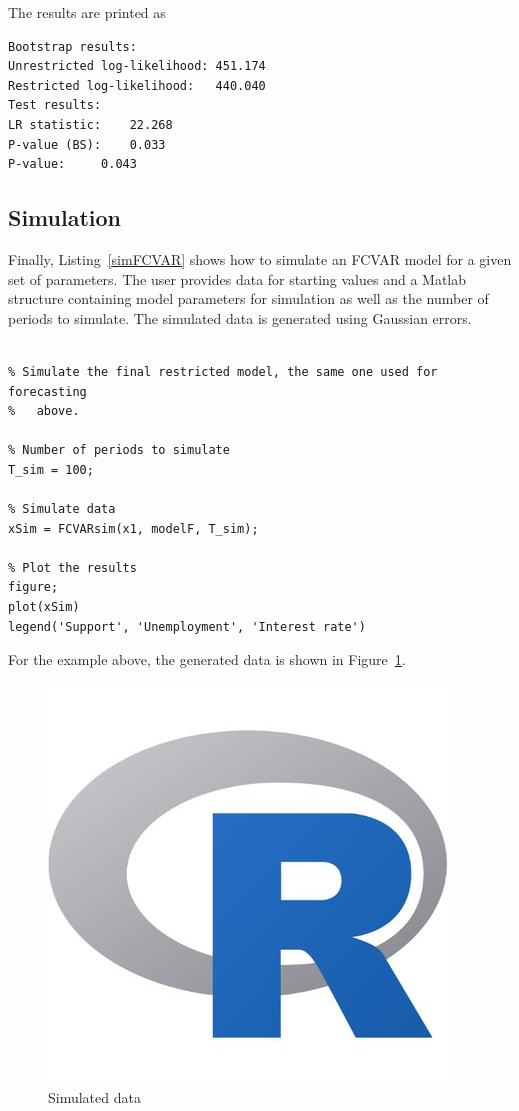 \documentclass[10pt]{article}
\begin{document}
The results are printed as
\begin{verbatim}
Bootstrap results:
Unrestricted log-likelihood: 451.174
Restricted log-likelihood:   440.040
Test results:
LR statistic: 	 22.268
P-value (BS): 	 0.033
P-value: 	 0.043
\end{verbatim}

\subsection{Simulation}
\label{sec:simulation}

Finally, Listing~\ref{simFCVAR} shows how to simulate an FCVAR model for a given set of parameters. The user provides data for starting values and a Matlab structure containing model parameters for simulation as well as the number of periods to simulate. The simulated data is generated using Gaussian errors.

\begin{lstlisting}[frame=single,caption={Simulation}, label = simFCVAR]
%% --------- SIMULATION ---------- %

% Simulate the final restricted model, the same one used for forecasting
%   above.

% Number of periods to simulate
T_sim = 100;

% Simulate data
xSim = FCVARsim(x1, modelF, T_sim);

% Plot the results
figure;
plot(xSim)
legend('Support', 'Unemployment', 'Interest rate')
\end{lstlisting}

For the example above, the generated data is shown in Figure~\ref{fig:sim}.

\begin{figure}[tbh]
  \centering
  \caption{Simulated data}
  \label{fig:sim}
  \includegraphics[scale = 1, keepaspectratio=true]{sim.png}
\end{figure}
\end{document}
